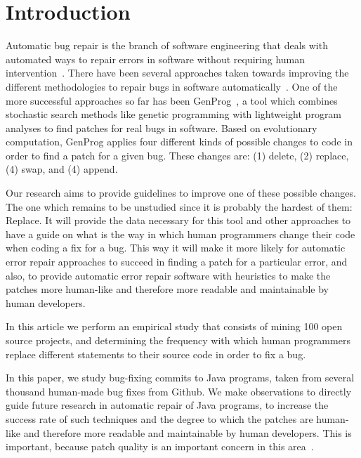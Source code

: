 
\section{Introduction}

Automatic bug repair is the branch of software engineering that deals with automated ways to repair errors in software without requiring human intervention~\cite{kim2013, legoues2012, Mechtaev15, Long2016}. There have been several approaches taken towards improving the different methodologies to repair bugs in software automatically~\cite{kim2013, weimer2009, legoues2012, kai}. One of the more successful approaches so far has been GenProg~\cite{weimer2009, legoues2012}, a tool which combines stochastic search methods like genetic programming with lightweight program analyses to find patches for real bugs in software. Based on evolutionary computation, GenProg applies four different kinds of possible changes to code in order to find a patch for a given bug. These changes are: (1) delete, (2) replace, (4) swap, and (4) append.

Our research aims to provide guidelines to improve one of these possible changes. The one which remains to be unstudied since it is probably the hardest of them: Replace. It will provide the data necessary for this tool and other approaches to have a guide on what is the way in which human programmers change their code when coding a fix for a bug. This way it will make it more likely for automatic error repair approaches to succeed in finding a patch for a particular error, and also, to provide automatic error repair software with heuristics to make the patches more human-like and therefore more readable and maintainable by human developers.

In this article we perform an empirical study that consists of mining 100 open source projects, and determining the frequency with which human programmers replace different statements to their source code in order to fix a bug.

In this paper, we study bug-fixing commits to Java programs, 
taken from several thousand human-made bug fixes from Github. We make
observations to directly guide future research in automatic repair of Java
programs, to increase the success rate of such techniques and the degree to
which the patches are human-like and therefore more readable and maintainable by
human developers. This is important, because patch quality is an important
concern in this area~\cite{Qi15}.

